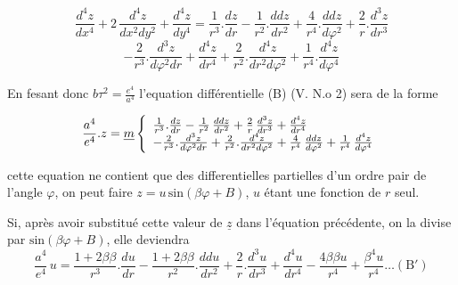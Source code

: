 \documentclass[11pt,a4paper]{article}
\begin{document}
\[ \frac{d^{4}z}{dx^{4}} + 2\,\frac{d^{4}z}{dx^{2}dy^{2}} + \frac{d^{4}z}{dy^{4}} = \frac{1}{r^{3}}.\frac{dz}{dr} - \frac{1}{r^{2}}.\frac{ddz}{dr^{2}} + \frac{4}{r^{4}}.\frac{ddz}{d\varphi^{2}} + \frac{2}{r}.\frac{d^{3}z}{dr^{3}} \]
\[ - \frac{2}{r^{3}}.\frac{d^{3}z}{d\varphi^{2}dr} + \frac{d^{4}z}{dr^{4}} + \frac{2}{r^{2}}.\frac{d^{4}z}{dr^{2}d\varphi^{2}} + \frac{1}{r^{4}}.\frac{d^{4}z}{d\varphi^{4}} \]

En fesant donc  $b\tau^{2} = \frac{e^{4}}{a^{4}}$ l'equation différentielle (B) (V. N.o 2)
sera de la forme

\[ \frac{a^{4}}{e^{4}}.z = \struck{m}\left\{\begin{array}{l} \frac{1}{r^{3}}.\frac{dz}{dr} - \frac{1}{r^{2}}\,\frac{ddz}{dr^{2}} + \frac{2}{r}\,\frac{d^{3}z}{dr^{3}} + \frac{d^{4}z}{dr^{4}} \\ - \frac{2}{r^{3}}.\frac{d^{3}z}{d\varphi^{2}dr} + \frac{2}{r^{2}}.\frac{d^{4}z}{dr^{2}d\varphi^{2}} + \frac{4}{r^{4}}\,\frac{ddz}{d\varphi^{2}} + \frac{1}{r^{4}}\,\frac{d^{4}z}{d\varphi^{4}} \end{array}\right. \]

cette equation ne contient que des differentielles partielles d'un ordre
pair de l'angle $\varphi$,  on peut
faire $z = u\,\text{sin}(\beta\varphi + B)$, $u$ étant une fonction de $r$ seul.

Si, après avoir substitué cette valeur de $\underline{z}$ dans l'équation
précédente, on la divise par $\text{sin}(\beta\varphi + B)$, elle deviendra
\[ \frac{a^{4}}{e^{4}}\,u = \frac{1 + 2\beta\beta}{r^{3}}.\frac{du}{dr} - \frac{1 + 2\beta\beta}{r^{2}}.\frac{ddu}{dr^{2}} + \frac{2}{r}.\frac{d^{3}u}{dr^{3}} + \frac{d^{4}u}{dr^{4}} - \frac{4\beta\beta u}{r^{4}} + \frac{\beta^{4}u}{r^{4}} \dots (\text{B}') \]
\end{document}
